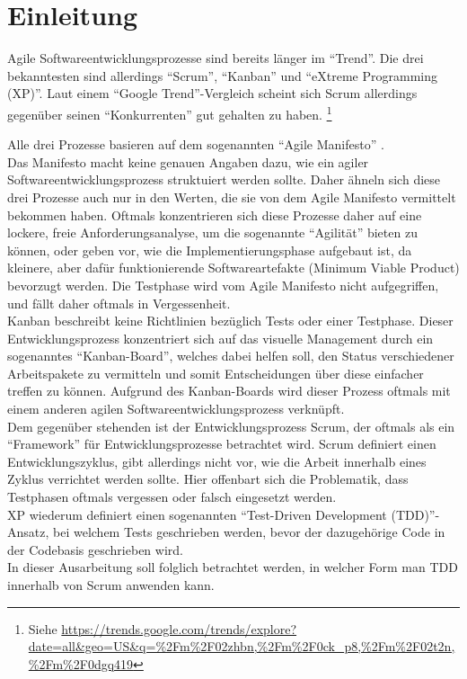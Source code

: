 \documentclass[12pt,DIV14,BCOR10mm,a4paper,twoside,parskip=half-,headsepline,headinclude,english,ngerman,bibliography=totocnumbered]{scrreprt}
\begin{document}
\tableofcontents  %

\chapter{Einleitung}

Agile Softwareentwicklungsprozesse sind bereits länger im \enquote{Trend}.
Die drei bekanntesten sind allerdings \enquote{Scrum}, \enquote{Kanban} und \enquote{eXtreme Programming (XP)}.
Laut einem \enquote{Google Trend}-Vergleich scheint sich Scrum allerdings gegenüber seinen \enquote{Konkurrenten} gut gehalten zu haben. \footnote{Siehe \url{https://trends.google.com/trends/explore?date=all\&geo=US\&q=\%2Fm\%2F02zhbn,\%2Fm\%2F0ck\_p8,\%2Fm\%2F02t2n,\%2Fm\%2F0dgq419}}

Alle drei Prozesse basieren auf dem sogenannten \enquote{Agile Manifesto} \autocite{AgileManifesto}. \\
Das Manifesto macht keine genauen Angaben dazu, wie ein agiler Softwareentwicklungsprozess struktuiert werden sollte.
Daher ähneln sich diese drei Prozesse auch nur in den Werten, die sie von dem Agile Manifesto vermittelt bekommen haben.
Oftmals konzentrieren sich diese Prozesse daher auf eine lockere, freie Anforderungsanalyse, um die sogenannte \enquote{Agilität} bieten zu können, oder geben vor, wie die Implementierungsphase aufgebaut ist, da kleinere, aber dafür funktionierende Softwareartefakte (Minimum Viable Product) bevorzugt werden.
Die Testphase wird vom Agile Manifesto nicht aufgegriffen, und fällt daher oftmals in Vergessenheit.  \\
Kanban beschreibt keine Richtlinien bezüglich Tests oder einer Testphase.
Dieser Entwicklungsprozess konzentriert sich auf das visuelle Management durch ein sogenanntes \enquote{Kanban-Board}, welches dabei helfen soll, den Status verschiedener Arbeitspakete zu vermitteln und somit Entscheidungen über diese einfacher treffen zu können.
Aufgrund des Kanban-Boards wird dieser Prozess oftmals mit einem anderen agilen Softwareentwicklungsprozess verknüpft.  \\
Dem gegenüber stehenden ist der Entwicklungsprozess Scrum, der oftmals als ein \enquote{Framework} für Entwicklungsprozesse betrachtet wird.
Scrum definiert einen Entwicklungszyklus, gibt allerdings nicht vor, wie die Arbeit innerhalb eines Zyklus verrichtet werden sollte.
Hier offenbart sich die Problematik, dass Testphasen oftmals vergessen oder falsch eingesetzt werden. \\
XP wiederum definiert einen sogenannten \enquote{Test-Driven Development (TDD)}-Ansatz, bei welchem Tests geschrieben werden, bevor der dazugehörige Code in der Codebasis geschrieben wird.  \\
In dieser Ausarbeitung soll folglich betrachtet werden, in welcher Form man TDD innerhalb von Scrum anwenden kann.
\end{document}
